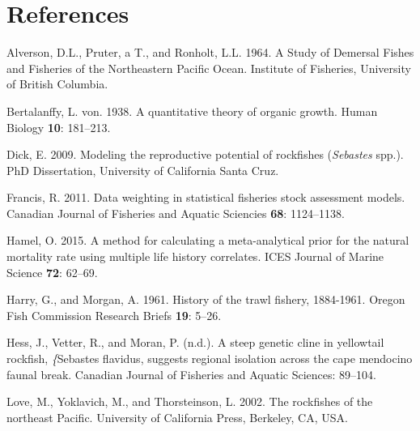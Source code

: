 \documentclass[12pt,]{article}
\begin{document}
\FloatBarrier

\FloatBarrier

\FloatBarrier

\FloatBarrier

\FloatBarrier

\newpage

\color{black}

\section*{References}\label{references}

\renewcommand{\thepage}{}


\hypertarget{refs}{}
\hypertarget{ref-Alverson1964}{}
Alverson, D.L., Pruter, a T., and Ronholt, L.L. 1964. A Study of
Demersal Fishes and Fisheries of the Northeastern Pacific Ocean.
Institute of Fisheries, University of British Columbia.

\hypertarget{ref-vonB1938}{}
Bertalanffy, L. von. 1938. A quantitative theory of organic growth.
Human Biology \textbf{10}: 181--213.

\hypertarget{ref-Dick2009}{}
Dick, E. 2009. Modeling the reproductive potential of rockfishes
(\emph{Sebastes} spp.). PhD Dissertation, University of California Santa
Cruz.

\hypertarget{ref-Francis2011}{}
Francis, R. 2011. Data weighting in statistical fisheries stock
assessment models. Canadian Journal of Fisheries and Aquatic Sciencies
\textbf{68}: 1124--1138.

\hypertarget{ref-Hamel2015}{}
Hamel, O. 2015. A method for calculating a meta-analytical prior for the
natural mortality rate using multiple life history correlates. ICES
Journal of Marine Science \textbf{72}: 62--69.

\hypertarget{ref-Harry1961}{}
Harry, G., and Morgan, A. 1961. History of the trawl fishery, 1884-1961.
Oregon Fish Commission Research Briefs \textbf{19}: 5--26.

\hypertarget{ref-Hess2011}{}
Hess, J., Vetter, R., and Moran, P. (n.d.). A steep genetic cline in
yellowtail rockfish, \emph{\{}Sebastes flavidus, suggests regional
isolation across the cape mendocino faunal break. Canadian Journal of
Fisheries and Aquatic Sciences: 89--104.

\hypertarget{ref-Love2002}{}
Love, M., Yoklavich, M., and Thorsteinson, L. 2002. The rockfishes of
the northeast Pacific. University of California Press, Berkeley, CA,
USA.
\end{document}
